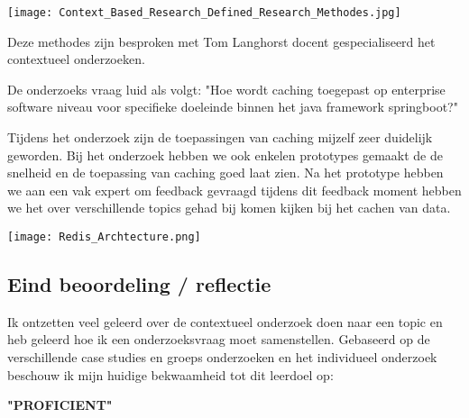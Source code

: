 \texttt{[image: Context\_Based\_Research\_Defined\_Research\_Methodes.jpg]}\label{fig:research_methodes}

Deze methodes zijn besproken met Tom Langhorst docent gespecialiseerd het contextueel onderzoeken.

De onderzoeks vraag luid als volgt: "Hoe wordt caching toegepast op enterprise software niveau voor specifieke doeleinde binnen het java framework springboot?"

Tijdens het onderzoek zijn de toepassingen van caching mijzelf zeer duidelijk geworden.
Bij het onderzoek hebben we ook enkelen prototypes gemaakt de de snelheid en de toepassing van caching goed laat zien.
Na het prototype hebben we aan een vak expert om feedback gevraagd tijdens dit feedback moment hebben we het over verschillende topics gehad bij komen kijken bij het cachen van data.

\texttt{[image: Redis\_Archtecture.png]}\label{fig:redis_architecture}

\subsection{Eind beoordeling / reflectie}
Ik ontzetten veel geleerd over de contextueel onderzoek doen naar een topic en heb geleerd hoe ik een onderzoeksvraag moet samenstellen.
Gebaseerd op de verschillende case studies en groeps onderzoeken en het individueel onderzoek beschouw ik mijn huidige bekwaamheid tot dit leerdoel op:\\
\par\vspace{10pt}\textbf{\uppercase{"Proficient"}}\\


\newpage
